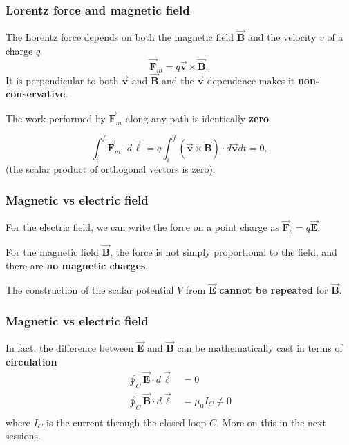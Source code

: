 \documentclass{beamer}
\makeatletter
\newcommand{\vc}[1]{\vec{\boldsymbol{#1}}}
\let\HL\hl
\renewcommand\hl{%
  \let\set@color\beamerorig@set@color
  \let\reset@color\beamerorig@reset@color
  \HL}
\makeatother
\begin{document}
\begin{frame}
\frametitle{Lorentz force and magnetic field}
\small
The Lorentz force depends on both the magnetic field $\vc{B}$ and the velocity $v$ of a charge $q$
\begin{equation}
	\vc{F}_m=q \vc{v} \times \vc{B},
\end{equation}
It is perpendicular to both $\vc{v}$ and $\vc{B}$ and the $\vc{v}$ dependence makes it \textbf{non-conservative}.\newline


The work performed by $\vc{F}_m$  along any path is identically \textbf{zero}

\begin{equation}
	\int_i^f \vc{F}_m\cdot d\vc{\ell}=q\int_i^f  (\vc{v} \times \vc{B})\cdot d\vc{v}dt=0,
\end{equation}
(the scalar product of orthogonal vectors is zero).\newline
%
\end{frame}

\begin{frame}
	\frametitle{Magnetic vs electric field}

	For the electric field, we can write the force on a point charge as $\vc{F}_e = q\vc{E}$.\newline
	
	For the magnetic field $\vc{B}$, the force is not simply proportional to the field, and there are \textbf{no magnetic charges}. 
	
	The construction of the scalar potential $V$ from $\vc{E}$ \textbf{cannot be repeated }for $\vc{B}$.\newline
	
	\end{frame}

\begin{frame}
\frametitle{Magnetic vs electric field}

	In fact, the difference between $\vc{E}$ and $\vc{B}$ can be mathematically cast in terms of \textbf{circulation}
	\begin{align}
		\oint_C \vc{E}\cdot d \vc{\ell}&=0\\
		\oint_C \vc{B}\cdot d \vc{\ell}&=\mu_0 I_C\neq0\\
	\end{align}
	where $I_C$ is the current through the closed loop $C$. \newline More on this in the next sessions.\newline
	
	
\end{frame}
\end{document}
